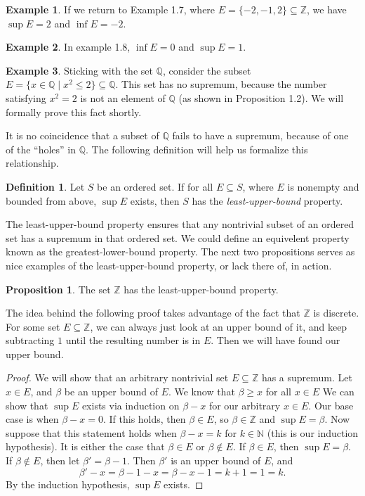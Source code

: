 \documentclass{article}
\newcommand{\N}{\mathbb{N}}
\newcommand{\Q}{\mathbb{Q}}
\newcommand{\Z}{\mathbb{Z}}
\theoremstyle{definition}
\newtheorem{proposition}{Proposition}[section]
\newtheorem{definition}{Definition}[section]
\newtheorem{example}{Example}[section]
\begin{document}
	\begin{example}
		If we return to Example 1.7, where $ E=\{-2,-1,2\}\subseteq\Z $, we have $ \sup E=2 $ and $ \inf E=-2 $. 
	\end{example}
	\begin{example}
		In example 1.8, $ \inf E=0 $ and $ \sup E=1 $.
	\end{example}
	\begin{example}
		Sticking with the set $ \Q$, consider the subset $ E=\{x\in\Q\mid x^2\le 2\}\subseteq \Q $. This set has no supremum, because the number satisfying $ x^2=2 $ is not an element of $ \Q $ (as shown in Proposition 1.2). We will formally prove this fact shortly. 
	\end{example}
	It is no coincidence that a subset of $ \Q $ fails to have a supremum, because of one of the ``holes'' in $ \Q $. The following definition will help us formalize this relationship. 
	\begin{definition}
		Let $ S $ be an ordered set. If for all $ E\subseteq S $, where $ E $ is nonempty and bounded from above, $ \sup E $ exists, then $ S $ has the \textit{\color{red}least-upper-bound} property. 
	\end{definition}
	The least-upper-bound property ensures that any nontrivial subset of an ordered set has a supremum in that ordered set. We could define an equivelent property known as the greatest-lower-bound property. The next two propositions serves as nice examples of the least-upper-bound property, or lack there of,  in action.
	\begin{proposition}
		The set $ \Z $ has the least-upper-bound property.
	\end{proposition}
	The idea behind the following proof takes advantage of the fact that $ \Z $ is discrete. For some set $ E\subseteq \Z $, we can always just look at an upper bound of it, and keep subtracting $ 1 $ until the resulting number is in $ E $. Then we will have found our upper bound.
	\begin{proof}
		We will show that an arbitrary nontrivial set $ E\subseteq \Z $ has a supremum. Let $ x\in E $, and $ \beta $ be an upper bound of $ E $. We know that $ \beta\ge x $ for all $ x\in E $ We can show that $ \sup E $ exists via induction on $ \beta-x $ for our arbitrary $ x\in E $. Our base case is when $ \beta-x=0 $. If this holds, then $ \beta\in E $, so $ \beta\in\Z $ and $ \sup E=\beta $. Now suppose that this statement holds when $ \beta-x=k $ for $ k\in\N $ (this is our induction hypothesis). It is either the case that $ \beta\in E $ or $ \beta\notin E $. If $ \beta\in E $, then $ \sup E=\beta $. If $ \beta \notin E $, then let $ \beta'=\beta -1 $. Then $ \beta' $ is an upper bound of $ E $, and $$\beta'-x=\beta-1-x=\beta-x-1=k+1=1=k .$$ By the induction hypothesis, $ \sup E $ exists.   
	\end{proof}
\end{document}
